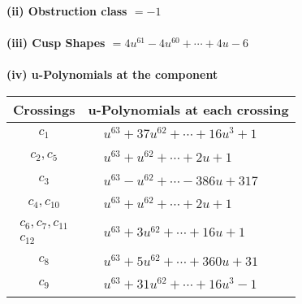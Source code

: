 \documentclass[1p]{elsarticle_modified}
\theoremstyle{definition}
\begin{document}
\flushleft \textbf{(ii) Obstruction class $= -1$}\\~\\
\flushleft \textbf{(iii) Cusp Shapes $= 4 u^{61}-4 u^{60}+\cdots+4 u-6$}\\~\\
\newpage\renewcommand{\arraystretch}{1}
\flushleft \textbf{(iv) u-Polynomials at the component}\newline \\
\begin{tabular}{m{50pt}|m{274pt}}
Crossings & \hspace{64pt}u-Polynomials at each crossing \\
\hline $$\begin{aligned}c_{1}\end{aligned}$$&$\begin{aligned}
&u^{63}+37 u^{62}+\cdots+16 u^3+1
\end{aligned}$\\
\hline $$\begin{aligned}c_{2},c_{5}\end{aligned}$$&$\begin{aligned}
&u^{63}+u^{62}+\cdots+2 u+1
\end{aligned}$\\
\hline $$\begin{aligned}c_{3}\end{aligned}$$&$\begin{aligned}
&u^{63}- u^{62}+\cdots-386 u+317
\end{aligned}$\\
\hline $$\begin{aligned}c_{4},c_{10}\end{aligned}$$&$\begin{aligned}
&u^{63}+u^{62}+\cdots+2 u+1
\end{aligned}$\\
\hline $$\begin{aligned}c_{6},c_{7},c_{11}\\c_{12}\end{aligned}$$&$\begin{aligned}
&u^{63}+3 u^{62}+\cdots+16 u+1
\end{aligned}$\\
\hline $$\begin{aligned}c_{8}\end{aligned}$$&$\begin{aligned}
&u^{63}+5 u^{62}+\cdots+360 u+31
\end{aligned}$\\
\hline $$\begin{aligned}c_{9}\end{aligned}$$&$\begin{aligned}
&u^{63}+31 u^{62}+\cdots+16 u^3-1
\end{aligned}$\\
\hline
\end{tabular}\\~\\
\end{document}
